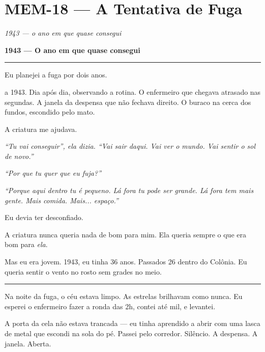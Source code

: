 \section*{\textbf{MEM-18} --- A Tentativa de Fuga}

\noindent \textit{1943 --- o ano em que quase consegui}

\noindent \textbf{1943 --- O ano em que quase consegui}

\vspace{0.5em}\noindent\rule{\textwidth}{0.5pt}\vspace{0.5em}

\noindent Eu planejei a fuga por dois anos.

 a 1943. Dia após dia, observando a rotina. O enfermeiro que chegava atrasado nas segundas. A janela da despensa que não fechava direito. O buraco na cerca dos fundos, escondido pelo mato.

\noindent A criatura me ajudava.

\noindent \textit{\textquotedblleft{}Tu vai conseguir\textquotedblright{}\textit{, ela dizia. }\textquotedblleft{}Vai sair daqui. Vai ver o mundo. Vai sentir o sol de novo.\textquotedblright{}}

\noindent \textit{\textquotedblleft{}Por que tu quer que eu fuja?\textquotedblright{}}

\noindent \textit{\textquotedblleft{}Porque aqui dentro tu é pequeno. Lá fora tu pode ser grande. Lá fora tem mais gente. Mais comida. Mais... espaço.\textquotedblright{}}

\noindent Eu devia ter desconfiado.

\noindent A criatura nunca queria nada de bom para mim.
Ela queria sempre o que era bom para \textit{ela}.

\noindent Mas eu era jovem. 1943, eu tinha 36 anos. Passados 26 dentro do Colônia. Eu queria sentir o vento no rosto sem grades no meio.

\vspace{0.5em}\noindent\rule{\textwidth}{0.5pt}\vspace{0.5em}

\noindent Na noite da fuga, o céu estava limpo. As estrelas brilhavam como nunca. Eu esperei o enfermeiro fazer a ronda das 2h, contei até mil, e levantei.

\noindent A porta da cela não estava trancada --- eu tinha aprendido a abrir com uma lasca de metal que escondi na sola do pé. Passei pelo corredor. Silêncio. A despensa. A janela. Aberta.

